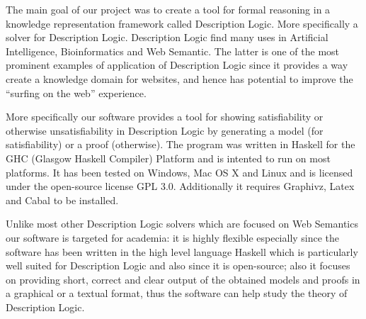 
The main goal of our project was to create a tool for formal reasoning
in a knowledge representation framework called Description Logic. More
specifically a solver for Description Logic. Description Logic find
many uses in Artificial Intelligence, Bioinformatics and Web
Semantic. The latter is one of the most prominent examples of
application of Description Logic since it provides a way create a
knowledge domain for websites, and hence has potential to improve the
``surfing on the web'' experience.

More specifically our software provides a tool for showing
satisfiability or otherwise unsatisfiability in Description Logic by
generating a model (for satisfiability) or a proof (otherwise). The
program was written in Haskell for the GHC (Glasgow Haskell Compiler)
Platform and is intented to run on most platforms. It has been tested
on Windows, Mac OS X and Linux and is licensed under the open-source
license GPL 3.0. Additionally it requires Graphivz, Latex and Cabal to
be installed.

Unlike most other Description Logic solvers which are focused on Web
Semantics our software is targeted for academia: it is highly flexible
especially since the software has been written in the high level
language Haskell which is particularly well suited for Description
Logic and also since it is open-source; also it focuses on providing
short, correct and clear output of the obtained models and proofs in a
graphical or a textual format, thus the software can help study the
theory of Description Logic.

